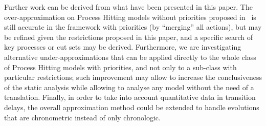 Further work can be derived from what have been presented in this paper.
The over-approximation on Process Hitting models without priorities proposed in~\cite{PMR12-MSCS}
is still accurate in the framework with priorities (by “merging” all actions),
but may be refined given the restrictions proposed in this paper,
and a specific search of key processes or cut sets may be derived.
Furthermore, we are investigating alternative under-approximations that can be
applied directly to the whole class of Process Hitting models with priorities,
and not only to a sub-class with particular restrictions;
such improvement may allow to increase the conclusiveness of the static analysis
while allowing to analyse any model without the need of a translation.
Finally, in order to take into account quantitative data in transition delays, the overall approximation method could be extended to handle evolutions that are chronometric instead of only chronologic.
